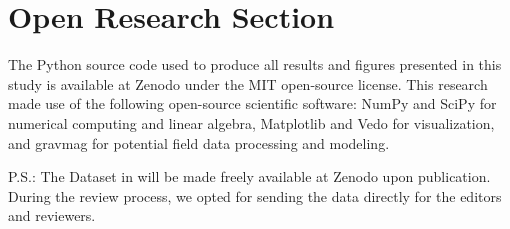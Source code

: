 \documentclass[draft]{agujournal2019}
\begin{document}






%
%

\section*{Open Research Section}
The Python source code used to produce all results and figures presented in this study is
available at Zenodo \cite{dataset} under the MIT open-source license.
This research made use of the following open-source scientific software: 
NumPy \cite{numpy} and SciPy \cite{scipy} for numerical computing and linear algebra, 
Matplotlib \cite{matplotlib} and Vedo \cite{vedo} for visualization, and
gravmag \cite{gravmag} for potential field data processing and modeling.

P.S.: The Dataset in  will be made freely available at Zenodo upon publication.
During the review process, we opted for sending the data directly for the editors and
reviewers.
\end{document}
